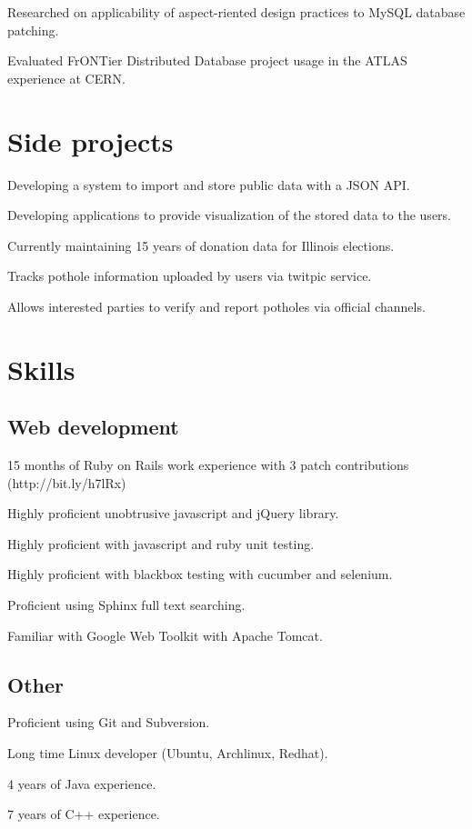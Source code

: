 \documentclass{resume}
\begin{document}
\begin{compactitem}
  \item Researched on applicability of aspect-riented design practices to MySQL database patching.
  \item Evaluated FrONTier Distributed Database project usage in the ATLAS experience at CERN.
\end{compactitem}

\section{Side projects}
\begin{compactitem}
  \item Developing a system to import and store public data with a JSON API.
  \item Developing applications to provide visualization of the stored data to the users.
  \item Currently maintaining 15 years of donation data for Illinois elections.
\end{compactitem}

\begin{compactitem}
  \item Tracks pothole information uploaded by users via twitpic service.
  \item Allows interested parties to verify and report potholes via official channels.
\end{compactitem}

\section{Skills}

\subsection{Web development}

\begin{compactitem}
  \item 15 months of Ruby on Rails work experience with 3 patch contributions (http://bit.ly/h7lRx)
  \item Highly proficient unobtrusive javascript and jQuery library.
  \item Highly proficient with javascript and ruby unit testing.
  \item Highly proficient with blackbox testing with cucumber and selenium.
  
  \item Proficient using Sphinx full text searching.
  \item Familiar with Google Web Toolkit with Apache Tomcat.
\end{compactitem}

\subsection{Other}
\begin{compactitem}
  \item Proficient using Git and Subversion.
  \item Long time Linux developer (Ubuntu, Archlinux, Redhat).
  \item 4 years of Java experience.
  \item 7 years of C++ experience.
\end{compactitem}
\end{document}
